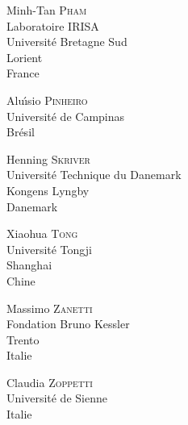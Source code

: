 \documentclass[main.tex]{subfiles}
\begin{document}
\begin{multicols}{2}
\begin{flushleft}
Minh-Tan \textsc{Pham}\\Laboratoire IRISA\\Universit\'{e} Bretagne Sud\\Lorient\\ France
\end{flushleft}

\begin{flushleft}
Alu\'{\i}sio \textsc{Pinheiro}\\Universit\'e de Campinas\\Brésil
\end{flushleft}

\begin{flushleft}
Henning \textsc{Skriver}\\Universit\'e Technique du Danemark\\Kongens Lyngby\\Danemark
\end{flushleft}

\begin{flushleft}
Xiaohua \textsc{Tong}\\Universit\'e Tongji\\Shanghai\\Chine
\end{flushleft}

\begin{flushleft}
Massimo \textsc{Zanetti}\\Fondation Bruno Kessler\\
Trento\\
Italie\\
\end{flushleft}

\begin{flushleft}
Claudia \textsc{Zoppetti}\\Universit\'e de Sienne\\Italie\\ 
\end{flushleft}\vspace*{50pt}

\end{multicols}
\end{document}
